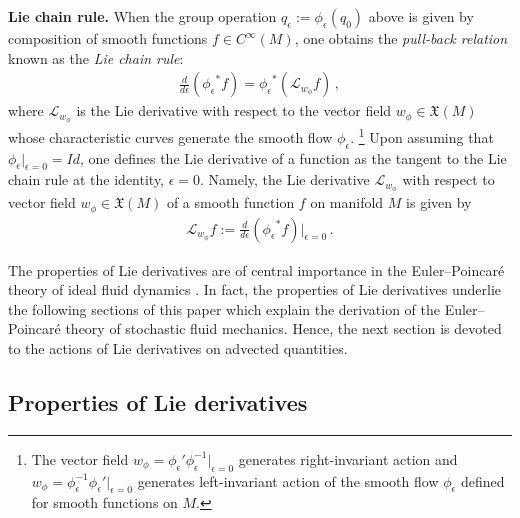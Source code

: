 \documentclass[11pt, oneside]{article}   	%
\numberwithin{equation}{section}
\theoremstyle{plain}
\theoremstyle{definition}
\theoremstyle{remark}
\newcommand{\<}{\langle}
\renewcommand{\>}{\rangle}
\begin{document}
\textbf{Lie chain rule.} When the group operation $q_\epsilon := \phi_\epsilon (q_0)$ above is given by composition of smooth functions $f\in C^\infty(M)$, one obtains the \emph{pull-back relation} known as the \emph{Lie chain rule}:
  
\begin{align}
\frac{d}{d\epsilon}({\phi_\epsilon}^* f ) = {\phi_\epsilon}^*( \mathcal{L}_{w_\phi} f)\,,
\label{LieChainRule}
\end{align}
where $ \mathcal{L}_{w_\phi}$ is the Lie derivative with respect to the vector field ${w_\phi}\in \mathfrak{X}(M)$ whose characteristic curves generate the smooth flow $\phi_\epsilon$.%
\footnote{The vector field ${w_\phi}=\phi_\epsilon'\phi_\epsilon^{-1}|_{\epsilon=0}$ generates right-invariant action 
and ${w_\phi}=\phi_\epsilon^{-1}\phi_\epsilon'|_{\epsilon=0}$ generates left-invariant action of the smooth flow $\phi_\epsilon$ defined for smooth functions on $M$.}
Upon assuming that $\phi_\epsilon|_{\epsilon=0}=Id$, one defines the Lie
 derivative of a function as the tangent to the Lie chain rule at the identity, $\epsilon=0$. Namely, the Lie  derivative $\mathcal{L}_{w_\phi}$ with respect to vector field ${w_\phi}\in \mathfrak{X}(M)$ of a smooth function $f$ on manifold $M$ is given by
\begin{align}
 \mathcal{L}_{w_\phi} f := \frac{d}{d\epsilon}({\phi_\epsilon}^* f )\Big|_{\epsilon=0} \,.
\label{def: LieDerivative}
\end{align}

The properties of Lie derivatives are of central importance in the Euler--Poincar\'e theory of ideal fluid dynamics \cite{HMR1998}. In fact, the properties of Lie derivatives underlie the following sections of this paper which explain the derivation of the Euler--Poincar\'e theory of stochastic fluid mechanics. Hence, the next section is devoted to the actions of Lie derivatives on advected quantities.
 \medskip
 
\subsection{Properties of Lie derivatives}
\end{document}
